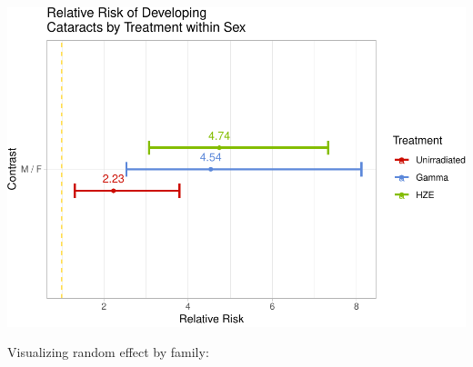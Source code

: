 \documentclass[
]{article}
\begin{document}
\includegraphics{final_report_files/figure-latex/RR1-1.pdf}

Visualizing random effect by family:
\end{document}
